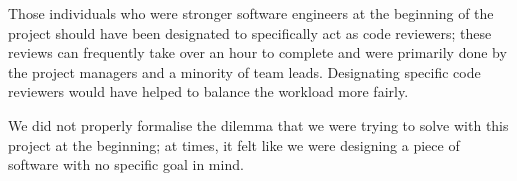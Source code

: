 Those individuals who were stronger software engineers at the beginning of the project should have been designated to specifically act as code reviewers; these reviews can frequently take over an hour to complete and were primarily done by the project managers and a minority of team leads. Designating specific code reviewers would have helped to balance the workload more fairly.

We did not properly formalise the dilemma that we were trying to solve with this project at the beginning; at times, it felt like we were designing a piece of software with no specific goal in mind.
